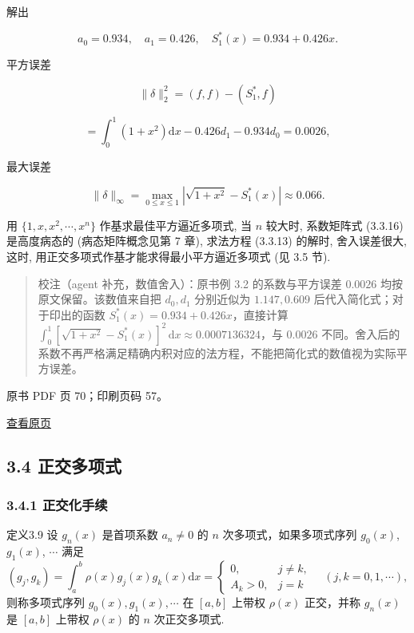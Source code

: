 解出

\[
a_0 = 0.934, \quad a_1 = 0.426, \quad S_1^*(x) = 0.934 + 0.426x.
\]

平方误差

\[
\|\delta\|_2^2 = (f, f) - (S_1^*, f)
\]

\[
= \int_0^1 (1+x^2) \mathrm{d}x - 0.426 d_1 - 0.934 d_0 = 0.0026,
\]

最大误差

\[
\|\delta\|_\infty = \max_{0 \leqslant x \leqslant 1} |\sqrt{1+x^2} - S_1^*(x)| \approx 0.066.
\]

用 \(\{1, x, x^2, \cdots, x^n\}\) 作基求最佳平方逼近多项式, 当 \(n\) 较大时, 系数矩阵式 (3.3.16) 是高度病态的 (病态矩阵概念见第 7 章), 求法方程 (3.3.13) 的解时, 舍入误差很大, 这时, 用正交多项式作基才能求得最小平方逼近多项式 (见 3.5 节).

\begin{quote}
校注（agent 补充，数值舍入）：原书例 3.2 的系数与平方误差 \(0.0026\) 均按原文保留。该数值来自把 \(d_0,d_1\) 分别近似为 \(1.147,0.609\) 后代入简化式；对于印出的函数 \(S_1^*(x)=0.934+0.426x\)，直接计算 \(\int_0^1[\sqrt{1+x^2}-S_1^*(x)]^2\,\mathrm{d}x\approx0.0007136324\)，与 \(0.0026\) 不同。舍入后的系数不再严格满足精确内积对应的法方程，不能把简化式的数值视为实际平方误差。
\end{quote}

\clearpage

原书 PDF 页 70；印刷页码 57。

\href{source-images/pdf-070.jpeg}{查看原页}

\subsection{3.4 正交多项式}\label{ch03a-ux6b63ux4ea4ux591aux9879ux5f0f}

\subsubsection{3.4.1 正交化手续}\label{ch03a-ux6b63ux4ea4ux5316ux624bux7eed}

定义3.9 设 \(g_n(x)\) 是首项系数 \(a_n \neq 0\) 的 \(n\) 次多项式，如果多项式序列 \(g_0(x)\), \(g_1(x)\), \(\cdots\) 满足 \[
(g_j, g_k) = \int_a^b \rho(x) g_j(x) g_k(x) \mathrm{d}x = \begin{cases} 0, & j \neq k, \\ A_k > 0, & j = k \end{cases} \quad (j, k = 0, 1, \cdots),
\] 则称多项式序列 \(g_0(x), g_1(x), \cdots\) 在 \([a, b]\) 上带权 \(\rho(x)\) 正交，并称 \(g_n(x)\) 是 \([a, b]\) 上带权 \(\rho(x)\) 的 \(n\) 次正交多项式.

